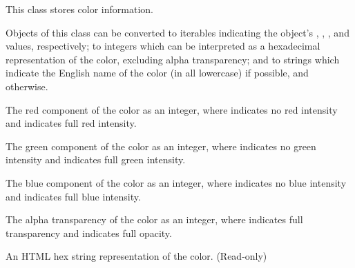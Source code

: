 \documentclass[letterpaper,10pt,english]{sphinxmanual}
\begin{document}
\begin{fulllineitems}
\label{gfx:sge.gfx.Color}
This class stores color information.

Objects of this class can be converted to iterables indicating the
object's {\hyperref[gfx:sge.gfx.Color.red]{\emph{}}}, {\hyperref[gfx:sge.gfx.Color.green]{\emph{}}}, {\hyperref[gfx:sge.gfx.Color.blue]{\emph{}}}, and {\hyperref[gfx:sge.gfx.Color.alpha]{\emph{}}}
values, respectively; to integers which can be interpreted as a
hexadecimal representation of the color, excluding alpha
transparency; and to strings which indicate the English name of the
color (in all lowercase) if possible, and {\hyperref[gfx:sge.gfx.Color.hex_string]{\emph{}}}
otherwise.

\begin{fulllineitems}
\label{gfx:sge.gfx.Color.red}
The red component of the color as an integer, where 
indicates no red intensity and  indicates full red
intensity.

\end{fulllineitems}


\begin{fulllineitems}
\label{gfx:sge.gfx.Color.green}
The green component of the color as an integer, where 
indicates no green intensity and  indicates full green
intensity.

\end{fulllineitems}


\begin{fulllineitems}
\label{gfx:sge.gfx.Color.blue}
The blue component of the color as an integer, where 
indicates no blue intensity and  indicates full blue
intensity.

\end{fulllineitems}


\begin{fulllineitems}
\label{gfx:sge.gfx.Color.alpha}
The alpha transparency of the color as an integer, where 
indicates full transparency and  indicates full opacity.

\end{fulllineitems}


\begin{fulllineitems}
\label{gfx:sge.gfx.Color.hex_string}
An HTML hex string representation of the color.  (Read-only)

\end{fulllineitems}


\end{fulllineitems}
\end{document}
